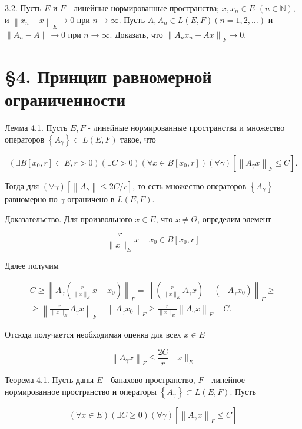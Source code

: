 3.2. Пусть $E$ и $F$ - линейные нормированные пространства; $x, x_{n} \in E$ $(n \in \mathbb{N})$, и $\left\|x_{n}-x\right\|_{E} \rightarrow 0$ при $n \rightarrow \infty$. Пусть $A, A_{n} \in L(E, F)(n=1,2, \ldots)$ и $\left\|A_{n}-A\right\| \rightarrow 0$ при $n \rightarrow \infty$. Доказать, что $\left\|A_{n} x_{n}-A x\right\|_{F} \rightarrow 0$.

\section*{§4. Принцип равномерной ограниченности}
Лемма 4.1. Пусть $E, F$ - линейные нормированные пространства и множество операторов $\left\{A_{\gamma}\right\} \subset L(E, F)$ такое, что

$$
\left(\exists B\left[x_{0}, r\right] \subset E, r>0\right)(\exists C>0)\left(\forall x \in B\left[x_{0}, r\right]\right)(\forall \gamma)\left[\left\|A_{\gamma} x\right\|_{F} \leq C\right] .
$$

Тогда для $(\forall \gamma)\left[\left\|A_{\gamma}\right\| \leq 2 C / r\right]$, то есть множество операторов $\left\{A_{\gamma}\right\}$ равномерно по $\gamma$ ограничено в $L(E, F)$.

Доказательство. Для произвольного $x \in E$, что $x \neq \Theta$, определим элемент

$$
\frac{r}{\|x\|_{E}} x+x_{0} \in B\left[x_{0}, r\right]
$$

Далее получим

$$
\begin{gathered}
C \geq\left\|A_{\gamma}\left(\frac{r}{\|x\|_{E}} x+x_{0}\right)\right\|_{F}=\left\|\left(\frac{r}{\|x\|_{E}} A_{\gamma} x\right)-\left(-A_{\gamma} x_{0}\right)\right\|_{F} \geq \\
\geq\left\|\frac{r}{\|x\|_{E}} A_{\gamma} x\right\|_{F}-\left\|A_{\gamma} x_{0}\right\|_{F} \geq \frac{r}{\|x\|_{E}}\left\|A_{\gamma} x\right\|_{F}-C .
\end{gathered}
$$

Отсюда получается необходимая оценка для всех $x \in E$

$$
\left\|A_{\gamma} x\right\|_{F} \leq \frac{2 C}{r}\|x\|_{E}
$$

Теорема 4.1. Пусть даны $E$ - банахово пространство, $F$ - линейное нормированное пространство и операторы $\left\{A_{\gamma}\right\} \subset L(E, F)$. Пусть

$$
(\forall x \in E)(\exists C \geq 0)(\forall \gamma)\left[\left\|A_{\gamma} x\right\|_{F} \leq C\right]
$$

